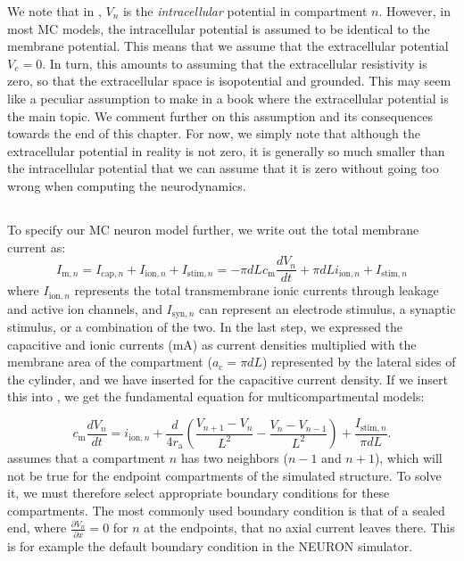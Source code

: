 We note that in , $V_n$ is the \emph{intracellular} potential in compartment $n$. However, in most MC models, the intracellular potential is assumed to be identical to the membrane potential. This means that we assume that the extracellular potential $V_e = 0$. In turn, this amounts to assuming that the extracellular resistivity is zero, so that the extracellular space is isopotential and grounded. This may seem like a peculiar assumption to make in a book where the extracellular potential is the main topic. We comment further on this assumption and its consequences towards the end of this chapter. For now, we simply note that although the extracellular potential in reality is not zero, it is generally so much smaller than the intracellular potential that we can assume that it is zero without going too wrong when computing the neurodynamics. 



\subsection{}
\label{sec:Neuron:Active_multicomp}
To specify our MC neuron model further, we write out the total membrane current as:
\begin{equation}
I_{\mathrm{m},n} = I_{\mathrm{cap},n} + I_{\mathrm{ion},n} + I_{\mathrm{stim},n} = -\pi d L c_\text{m} \frac{dV_n}{dt} + \pi d L i_{\mathrm{ion},n} + I_{\mathrm{stim},n}
\label{eq:Neuron:Imemb}
\end{equation}
where $I_{\mathrm{ion},n}$ represents the total transmembrane ionic currents through leakage and active ion channels, and $I_{\mathrm{syn},n}$ can represent an electrode stimulus, a synaptic stimulus, or a combination of the two. In the last step, we expressed the capacitive and ionic currents (\si{\milli\ampere}) as current densities multiplied with the membrane area of the compartment ($a_\text{c} = \pi d L$) represented by the lateral sides of the cylinder, and we have inserted  for the capacitive current density. If we insert this into , we get the fundamental equation for multicompartmental models:

\begin{equation}
c_\text{m} \frac{dV_n}{dt} = i_{\mathrm{ion},n} + \frac{d}{4r_\text{a}}\left(\frac{V_{n+1}-V_n}{L^2} - \frac{V_n-V_{n-1}}{L^2} \right) + \frac{I_{\mathrm{stim},n}}{\pi d L}.
\label{eq:Neuron:multimain}
\end{equation}
 assumes that a compartment $n$ has two neighbors ($n-1$ and $n+1$), which will not be true for the endpoint compartments of the simulated structure. To solve it, we must therefore select appropriate boundary conditions for these compartments. The most commonly used boundary condition is that of a sealed end, where $\frac{\partial V_n}{\partial x} = 0$ for $n$ at the endpoints, that no axial current leaves there.  This is for example the default boundary condition in the NEURON simulator. 

